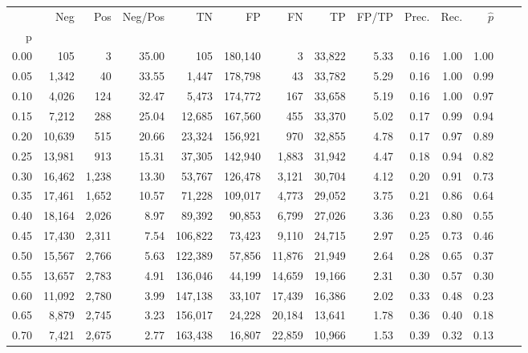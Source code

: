 \begin{tabular}{rrrrrrrrrrrrrr}
\toprule
{} &     Neg &    Pos & Neg/Pos &       TN &       FP &      FN &      TP & FP/TP & Prec. &  Rec. & $\hat{p}$ \\
p    &         &        &         &          &          &         &         &       &       &       &           \\
\midrule
0.00 &     105 &      3 &   35.00 &      105 &  180,140 &       3 &  33,822 &  5.33 &  0.16 &  1.00 &      1.00 \\
0.05 &   1,342 &     40 &   33.55 &    1,447 &  178,798 &      43 &  33,782 &  5.29 &  0.16 &  1.00 &      0.99 \\
0.10 &   4,026 &    124 &   32.47 &    5,473 &  174,772 &     167 &  33,658 &  5.19 &  0.16 &  1.00 &      0.97 \\
0.15 &   7,212 &    288 &   25.04 &   12,685 &  167,560 &     455 &  33,370 &  5.02 &  0.17 &  0.99 &      0.94 \\
0.20 &  10,639 &    515 &   20.66 &   23,324 &  156,921 &     970 &  32,855 &  4.78 &  0.17 &  0.97 &      0.89 \\
0.25 &  13,981 &    913 &   15.31 &   37,305 &  142,940 &   1,883 &  31,942 &  4.47 &  0.18 &  0.94 &      0.82 \\
0.30 &  16,462 &  1,238 &   13.30 &   53,767 &  126,478 &   3,121 &  30,704 &  4.12 &  0.20 &  0.91 &      0.73 \\
0.35 &  17,461 &  1,652 &   10.57 &   71,228 &  109,017 &   4,773 &  29,052 &  3.75 &  0.21 &  0.86 &      0.64 \\
0.40 &  18,164 &  2,026 &    8.97 &   89,392 &   90,853 &   6,799 &  27,026 &  3.36 &  0.23 &  0.80 &      0.55 \\
0.45 &  17,430 &  2,311 &    7.54 &  106,822 &   73,423 &   9,110 &  24,715 &  2.97 &  0.25 &  0.73 &      0.46 \\
0.50 &  15,567 &  2,766 &    5.63 &  122,389 &   57,856 &  11,876 &  21,949 &  2.64 &  0.28 &  0.65 &      0.37 \\
0.55 &  13,657 &  2,783 &    4.91 &  136,046 &   44,199 &  14,659 &  19,166 &  2.31 &  0.30 &  0.57 &      0.30 \\
0.60 &  11,092 &  2,780 &    3.99 &  147,138 &   33,107 &  17,439 &  16,386 &  2.02 &  0.33 &  0.48 &      0.23 \\
0.65 &   8,879 &  2,745 &    3.23 &  156,017 &   24,228 &  20,184 &  13,641 &  1.78 &  0.36 &  0.40 &      0.18 \\
0.70 &   7,421 &  2,675 &    2.77 &  163,438 &   16,807 &  22,859 &  10,966 &  1.53 &  0.39 &  0.32 &      0.13 \\

\end{tabular}

